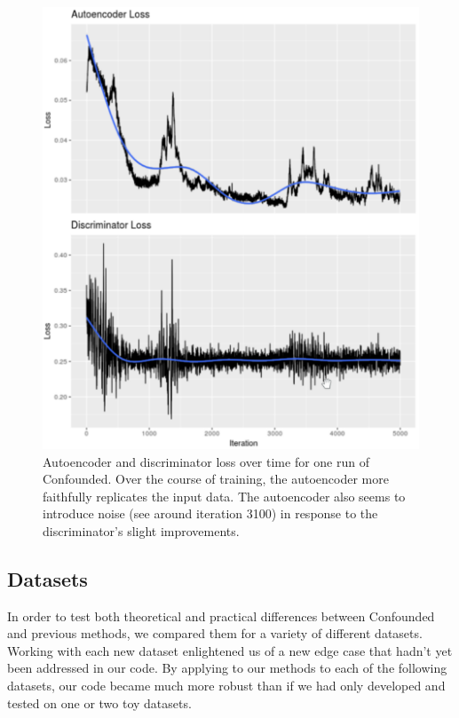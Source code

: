 \documentclass[notitlepage]{article}
\begin{document}
\begin{figure}
	\centering
	\includegraphics[width=\columnwidth]{figures/rough/training_loss}
	\caption{Autoencoder and discriminator loss over time for one run of Confounded.
	Over the course of training, the autoencoder more faithfully replicates the input data.
	The autoencoder also seems to introduce noise (see around iteration 3100) in response to the discriminator's slight improvements.}
	\label{fig:training_loss}
\end{figure}

\subsection{Datasets}

In order to test both theoretical and practical differences between Confounded and previous methods, we compared them for a variety of different datasets.
Working with each new dataset enlightened us of a new edge case that hadn't yet been addressed in our code.
By applying to our methods to each of the following datasets, our code became much more robust than if we had only developed and tested on one or two toy datasets.
\end{document}

